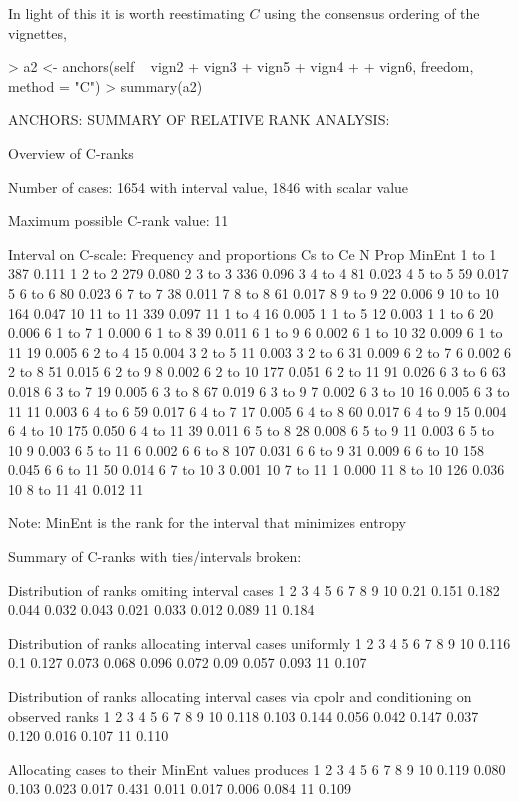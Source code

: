 \documentclass{amsart}
\begin{document}
In light of this it is worth reestimating $C$ using the consensus
ordering of the vignettes,
\begin{Schunk}
\begin{Sinput}
> a2 <- anchors(self ~ vign2 + vign3 + vign5 + vign4 + 
+     vign6, freedom, method = "C")
> summary(a2)
\end{Sinput}
\begin{Soutput}
ANCHORS: SUMMARY OF RELATIVE RANK ANALYSIS:

Overview of C-ranks

Number of cases: 1654 with interval value, 1846 with scalar value

Maximum possible C-rank value: 11

Interval on C-scale: Frequency and proportions Cs to Ce
           N  Prop MinEnt
 1 to  1 387 0.111      1
 2 to  2 279 0.080      2
 3 to  3 336 0.096      3
 4 to  4  81 0.023      4
 5 to  5  59 0.017      5
 6 to  6  80 0.023      6
 7 to  7  38 0.011      7
 8 to  8  61 0.017      8
 9 to  9  22 0.006      9
10 to 10 164 0.047     10
11 to 11 339 0.097     11
 1 to  4  16 0.005      1
 1 to  5  12 0.003      1
 1 to  6  20 0.006      6
 1 to  7   1 0.000      6
 1 to  8  39 0.011      6
 1 to  9   6 0.002      6
 1 to 10  32 0.009      6
 1 to 11  19 0.005      6
 2 to  4  15 0.004      3
 2 to  5  11 0.003      3
 2 to  6  31 0.009      6
 2 to  7   6 0.002      6
 2 to  8  51 0.015      6
 2 to  9   8 0.002      6
 2 to 10 177 0.051      6
 2 to 11  91 0.026      6
 3 to  6  63 0.018      6
 3 to  7  19 0.005      6
 3 to  8  67 0.019      6
 3 to  9   7 0.002      6
 3 to 10  16 0.005      6
 3 to 11  11 0.003      6
 4 to  6  59 0.017      6
 4 to  7  17 0.005      6
 4 to  8  60 0.017      6
 4 to  9  15 0.004      6
 4 to 10 175 0.050      6
 4 to 11  39 0.011      6
 5 to  8  28 0.008      6
 5 to  9  11 0.003      6
 5 to 10   9 0.003      6
 5 to 11   6 0.002      6
 6 to  8 107 0.031      6
 6 to  9  31 0.009      6
 6 to 10 158 0.045      6
 6 to 11  50 0.014      6
 7 to 10   3 0.001     10
 7 to 11   1 0.000     11
 8 to 10 126 0.036     10
 8 to 11  41 0.012     11

Note: MinEnt is the rank for the interval that minimizes entropy

Summary of C-ranks with ties/intervals broken:

Distribution of ranks omiting interval cases
    1     2     3     4     5     6     7     8     9    10
 0.21 0.151 0.182 0.044 0.032 0.043 0.021 0.033 0.012 0.089
    11
 0.184

Distribution of ranks allocating interval cases uniformly
     1   2     3     4     5     6     7    8     9    10
 0.116 0.1 0.127 0.073 0.068 0.096 0.072 0.09 0.057 0.093
    11
 0.107

Distribution of ranks allocating interval cases via cpolr
and conditioning on observed ranks
    1     2     3     4     5     6     7     8     9    10 
0.118 0.103 0.144 0.056 0.042 0.147 0.037 0.120 0.016 0.107 
   11 
0.110 

Allocating cases to their MinEnt values produces
    1     2     3     4     5     6     7     8     9    10 
0.119 0.080 0.103 0.023 0.017 0.431 0.011 0.017 0.006 0.084 
   11 
0.109 
\end{Soutput}
\end{Schunk}
\end{document}
